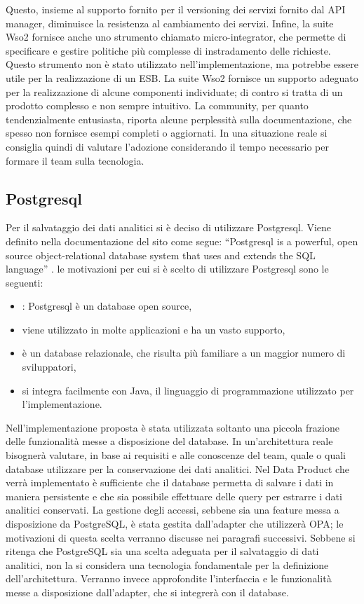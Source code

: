 \documentclass[a4paper,12pt]{report}
\begin{document}
Questo, insieme al supporto fornito per il versioning dei servizi fornito dal API manager, diminuisce la resistenza al cambiamento dei servizi. 
Infine, la suite Wso2 fornisce anche uno strumento chiamato micro-integrator, che permette di specificare e gestire politiche più complesse di instradamento delle richieste.
Questo strumento non è stato utilizzato nell'implementazione, ma potrebbe essere utile per la realizzazione di un ESB.
La suite Wso2 fornisce un supporto adeguato per la realizzazione di alcune componenti individuate; di contro si tratta di un prodotto complesso e non sempre intuitivo.
La community, per quanto tendenzialmente entusiasta, riporta alcune perplessità sulla documentazione, che spesso non fornisce esempi completi o aggiornati.
In una situazione reale si consiglia quindi di valutare l'adozione considerando il tempo necessario per formare il team sulla tecnologia.

\subsection{Postgresql}
Per il salvataggio dei dati analitici si è deciso di utilizzare Postgresql.
Viene definito nella documentazione del sito come segue: ``Postgresql is a powerful, open source object-relational database system that uses and extends the SQL language'' \cite{noauthor_postgresql_nodate}.
le motivazioni per cui si è scelto di utilizzare Postgresql sono le seguenti:
\begin{itemize}
    \item: Postgresql è un database open source,
    \item viene utilizzato in molte applicazioni e ha un vasto supporto,
    \item è un database relazionale, che risulta più familiare a un maggior numero di sviluppatori,
    \item si integra facilmente con Java, il linguaggio di programmazione utilizzato per l'implementazione.
\end{itemize}
Nell'implementazione proposta è stata utilizzata soltanto una piccola frazione delle funzionalità messe a disposizione del database.
In un'architettura reale bisognerà valutare, in base ai requisiti e alle conoscenze del team, quale o quali database utilizzare per la conservazione dei dati analitici.
Nel Data Product che verrà implementato è sufficiente che il database permetta di salvare i dati in maniera persistente e che sia possibile effettuare delle query per estrarre i dati analitici conservati. 
La gestione degli accessi, sebbene sia una feature messa a disposizione da PostgreSQL, è stata gestita dall'adapter che utilizzerà OPA; le motivazioni di questa scelta verranno discusse nei paragrafi successivi.
Sebbene si ritenga che PostgreSQL sia una scelta adeguata per il salvataggio di dati analitici, non la si considera una tecnologia fondamentale per la definizione dell'architettura.
Verranno invece approfondite l'interfaccia e le funzionalità messe a disposizione dall'adapter, che si integrerà con il database.
\end{document}
